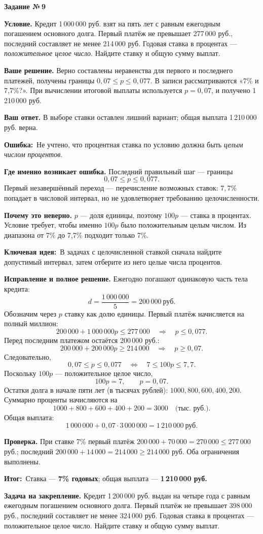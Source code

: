 \documentclass[a4paper,11pt]{article}
\newcommand{\wrong}{\textcolor{error}{\textbf{Ошибка:}}}
\newcommand{\idea}{\textcolor{deep}{\textbf{Ключевая идея:}}}
\newcommand{\result}{\textcolor{accent}{\textbf{Итог:}}}
\newcommand{\tasktitle}[1]{\phantomsection\label{task:#1}{\Large\color{deep}\textbf{Задание №\,#1}}\par\vspace{4mm}}
\begin{document}
\clearpage
\tasktitle{9}
{\textbf{Условие.}} Кредит 1\,000\,000 руб. взят на пять лет с
равным ежегодным погашением основного долга. Первый платёж
не превышает 277\,000 руб., последний составляет не менее
214\,000 руб. Годовая ставка в процентах --- \emph{положительное
целое число}. Найдите ставку и общую сумму выплат.

\textbf{Ваше решение.} Верно составлены неравенства для первого
и последнего платежей, получены границы \(0{,}07\le p\le0{,}077\).
В записи рассматриваются «7\% и 7{,}7\%?». При вычислении итоговой
выплаты используется \(p=0{,}07\), и получено 1\,210\,000 руб.

\textbf{Ваш ответ.} В выборе ставки оставлен лишний вариант;
общая выплата 1\,210\,000 руб. верна.

\wrong\ Не учтено, что процентная ставка по условию должна быть
\emph{целым числом процентов}.

\textbf{Где именно возникает ошибка.} Последний правильный шаг ---
границы
\[
0{,}07\le p\le0{,}077.
\]
Первый незавершённый переход --- перечисление возможных ставок:
\(7{,}7\%\) попадает в числовой интервал, но не удовлетворяет
требованию целочисленности.

\textbf{Почему это неверно.} \(p\) --- доля единицы, поэтому
\(100p\) --- ставка в процентах. Условие требует, чтобы именно
\(100p\) было положительным целым числом. Из диапазона
от 7\% до 7{,}7\% подходит только 7\%.

\idea\ В задачах с целочисленной ставкой сначала найдите
допустимый интервал, затем отберите из него целые числа процентов.

\textbf{Исправление и полное решение.}
Ежегодно погашают одинаковую часть тела кредита:
\[
d=\frac{1\,000\,000}{5}=200\,000\ \text{руб.}
\]
Обозначим через \(p\) ставку как долю единицы.
Первый платёж начисляется на полный миллион:
\[
200\,000+1\,000\,000p\le277\,000
\quad\Longrightarrow\quad p\le0{,}077.
\]
Перед последним платежом остаётся 200\,000 руб.:
\[
200\,000+200\,000p\ge214\,000
\quad\Longrightarrow\quad p\ge0{,}07.
\]
Следовательно,
\[
0{,}07\le p\le0{,}077
\quad\Longleftrightarrow\quad
7\le100p\le7{,}7.
\]
Поскольку \(100p\) --- положительное целое число,
\[
\boxed{100p=7},\qquad \boxed{p=0{,}07}.
\]
Остатки долга в начале пяти лет (в тысячах рублей):
\(1000,800,600,400,200\).
Суммарно проценты начисляются на
\[
1000+800+600+400+200=3000
\quad\text{(тыс. руб.).}
\]
Общая выплата:
\[
1\,000\,000+0{,}07\cdot3\,000\,000
=\boxed{1\,210\,000\ \text{руб.}}
\]

\textbf{Проверка.} При ставке 7\% первый платёж
\(200\,000+70\,000=270\,000\le277\,000\) руб.;
последний
\(200\,000+14\,000=214\,000\ge214\,000\) руб.
Оба ограничения выполнены.

\result\ Ставка --- \textbf{7\% годовых};
общая выплата --- \textbf{1\,210\,000 руб.}

\textbf{Задача на закрепление.} Кредит 1\,200\,000 руб. выдан на
четыре года с равным ежегодным погашением основного долга.
Первый платёж не превышает 398\,000 руб., последний составляет
не менее 324\,000 руб. Годовая ставка в процентах ---
положительное целое число. Найдите ставку и общую сумму выплат.
\end{document}

